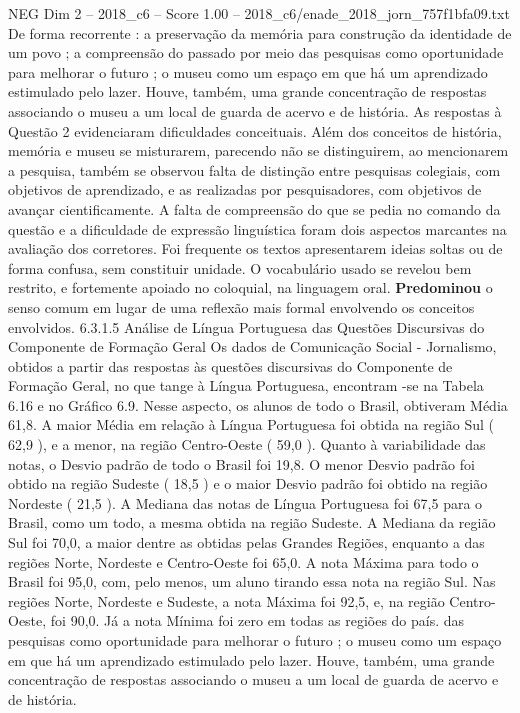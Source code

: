 \begin{textsample}{NEG Dim 2 – 2018\_c6 – Score 1.00 – 2018\_c6/enade\_2018\_jorn\_757f1bfa09.txt}
De forma recorrente : a preservação da memória para construção da identidade de um povo ; a compreensão do passado por meio das pesquisas como oportunidade para melhorar o futuro ; o museu como um espaço em que há um aprendizado estimulado pelo lazer.
Houve, também, uma grande concentração de respostas associando o museu a um local de guarda de acervo e de história.
As respostas à Questão 2 evidenciaram dificuldades conceituais.
Além dos conceitos de história, memória e museu se misturarem, parecendo não se distinguirem, ao mencionarem a pesquisa, também se observou falta de distinção entre pesquisas colegiais, com objetivos de aprendizado, e as realizadas por pesquisadores, com objetivos de avançar cientificamente.
A falta de compreensão do que se pedia no comando da questão e a dificuldade de expressão linguística foram dois aspectos marcantes na avaliação dos corretores.
Foi frequente os textos apresentarem ideias soltas ou de forma confusa, sem constituir unidade.
O vocabulário usado se revelou bem restrito, e fortemente apoiado no coloquial, na linguagem oral. \textbf{Predominou} o senso comum em lugar de uma reflexão mais formal envolvendo os conceitos envolvidos. 6.3.1.5 Análise de Língua Portuguesa das Questões Discursivas do Componente de Formação Geral Os dados de Comunicação Social - Jornalismo, obtidos a partir das respostas às questões discursivas do Componente de Formação Geral, no que tange à Língua Portuguesa, encontram -se na Tabela 6.16 e no Gráfico 6.9.
Nesse aspecto, os alunos de todo o Brasil, obtiveram Média 61,8.
A maior Média em relação à Língua Portuguesa foi obtida na região Sul ( 62,9 ), e a menor, na região Centro-Oeste ( 59,0 ).
Quanto à variabilidade das notas, o Desvio padrão de todo o Brasil foi 19,8.
O menor Desvio padrão foi obtido na região Sudeste ( 18,5 ) e o maior Desvio padrão foi obtido na região Nordeste ( 21,5 ).
A Mediana das notas de Língua Portuguesa foi 67,5 para o Brasil, como um todo, a mesma obtida na região Sudeste.
A Mediana da região Sul foi 70,0, a maior dentre as obtidas pelas Grandes Regiões, enquanto a das regiões Norte, Nordeste e Centro-Oeste foi 65,0.
A nota Máxima para todo o Brasil foi 95,0, com, pelo menos, um aluno tirando essa nota na região Sul.
Nas regiões Norte, Nordeste e Sudeste, a nota Máxima foi 92,5, e, na região Centro-Oeste, foi 90,0.
Já a nota Mínima foi zero em todas as regiões do país. das pesquisas como oportunidade para melhorar o futuro ; o museu como um espaço em que há um aprendizado estimulado pelo lazer.
Houve, também, uma grande concentração de respostas associando o museu a um local de guarda de acervo e de história.

\end{textsample}
